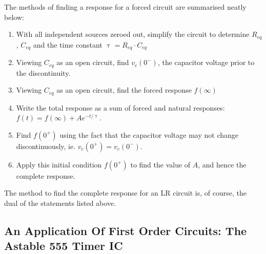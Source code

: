 \documentclass[11pt]{article}
\numberwithin{equation}{section}
\begin{document}
\begin{flushleft}
\begin{tcolorbox}[colback=green!5, colframe=green!75!black, title=\textbf{Example 2.3}, breakable]
\end{tcolorbox}

The methods of finding a response for a forced circuit are summarised neatly below:

\begin{tcolorbox}[arc=0mm]
 \begin{enumerate}
  \item With all independent sources zeroed out, simplify the circuit to determine $R_{eq}$, $C_{eq}$ and the time constant $\uptau=R_{eq}\cdot C_{eq}$
  \item Viewing $C_{eq}$ as an open circuit, find $v_c(0^-)$, the capacitor voltage prior to the discontinuity.
  \item Viewing $C_{eq}$ as an open circuit, find the forced response $f(\infty)$
  \item Write the total response as a sum of forced and natural responses: $f(t) = f(\infty)+Ae^{-t/\uptau}$.
  \item Find $f(0^+)$ using the fact that the capacitor voltage may not change discontinuously, ie. $v_c(0^+)=v_c(0^-)$.
  \item Apply this initial condition $f(0^+)$ to find the value of $A$, and hence the complete response.
 \end{enumerate}
\end{tcolorbox}

The method to find the complete response for an LR circuit is, of course, the dual of the statements listed above.

\color{blue}
\subsection{An Application Of First Order Circuits: The Astable 555 Timer IC}
\color{black}


\end{flushleft}
\end{document}
